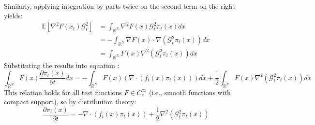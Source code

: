 \documentclass[a4paper,10pt]{article}
\begin{document}
Similarly, applying integration by parts twice on the second term on the right yields:
\begin{align*}
    \mathbb{E}[\nabla^2 F(x_t) \mathcal{G}_t^2] &= \int_{\mathbb{R}^N } \nabla^2 F(x) \mathcal{G}_t^2 \pi_t(x) dx \\
    &= -\int_{\mathbb{R}^N} \nabla F(x) \cdot \nabla(\mathcal{G}_t^2\pi_t(x)) dx \\
    &= \int_{\mathbb{R}^N} F(x) \nabla^2(\mathcal{G}_t^2 \pi_t(x)) dx
\end{align*}
Substituting the results into equation :
\[
\int_{\mathbb{R}^N}F(x)\frac{\partial\pi_t(x)}{\partial t} dx = - \int_{\mathbb{R}^N}F(x) (\nabla \cdot (f_t(x)\pi_t(x))) dx + \frac{1}{2}\int_{\mathbb{R}^N } F(x) \nabla^2(\mathcal{G}_t^2 \pi_t(x)) dx
\]
This relation holds for all test functions \( F \in C_c^{\infty} \) (i.e., smooth functions with compact support), so by distribution theory:
\[
\frac{\partial\pi_t(x)}{\partial t} = -\nabla \cdot (f_t(x)\pi_t(x)) + \frac{1}{2}\nabla^2(\mathcal{G}_t^2 \pi_t(x))
\]
\end{document}
